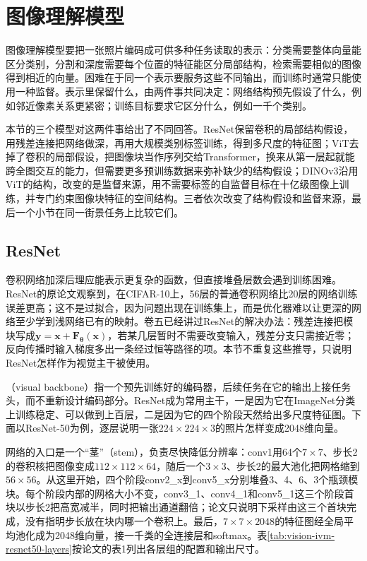 \section{图像理解模型}
\label{sec:vision-ivm-image-understanding}

图像理解模型要把一张照片编码成可供多种任务读取的表示：分类需要整体向量能区分类别，分割和深度需要每个位置的特征能区分局部结构，检索需要相似的图像得到相近的向量。困难在于同一个表示要服务这些不同输出，而训练时通常只能使用一种监督。表示里保留什么，由两件事共同决定：网络结构预先假设了什么，例如邻近像素关系更紧密；训练目标要求它区分什么，例如一千个类别。

本节的三个模型对这两件事给出了不同回答。ResNet保留卷积的局部结构假设，用残差连接把网络做深，再用大规模类别标签训练，得到多尺度的特征图；ViT去掉了卷积的局部假设，把图像块当作序列交给Transformer，换来从第一层起就能跨全图交互的能力，但需要更多预训练数据来弥补缺少的结构假设；DINOv3沿用ViT的结构，改变的是监督来源，用不需要标签的自监督目标在十亿级图像上训练，并专门约束图像块特征的空间结构。三者依次改变了结构假设和监督来源，最后一个小节在同一街景任务上比较它们。

\subsection{ResNet}
\label{sec:vision-ivm-resnet}

卷积网络加深后理应能表示更复杂的函数，但直接堆叠层数会遇到训练困难。ResNet的原论文观察到，在CIFAR-10上，56层的普通卷积网络比20层的网络训练误差更高；这不是过拟合，因为问题出现在训练集上，而是优化器难以让更深的网络至少学到浅网络已有的映射。卷五已经讲过ResNet的解决办法：残差连接把模块写成$\bm y=\bm x+\bm F_{\bm\theta}(\bm x)$，若某几层暂时不需要改变输入，残差分支只需接近零；反向传播时输入梯度多出一条经过恒等路径的项。本节不重复这些推导，只说明ResNet怎样作为视觉主干被使用。

（visual backbone）指一个预先训练好的编码器，后续任务在它的输出上接任务头，而不重新设计编码部分。ResNet成为常用主干，一是因为它在ImageNet分类上训练稳定、可以做到上百层，二是因为它的四个阶段天然给出多尺度特征图。下面以ResNet-50为例，逐层说明一张$224\times224\times3$的照片怎样变成2048维向量。

网络的入口是一个“茎”（stem），负责尽快降低分辨率：conv1用64个$7\times7$、步长2的卷积核把图像变成$112\times112\times64$，随后一个$3\times3$、步长2的最大池化把网格缩到$56\times56$。从这里开始，四个阶段conv2\_x到conv5\_x分别堆叠3、4、6、3个瓶颈模块。每个阶段内部的网格大小不变，conv3\_1、conv4\_1和conv5\_1这三个阶段首块以步长2把高宽减半，同时把输出通道翻倍；论文只说明下采样由这三个首块完成，没有指明步长放在块内哪一个卷积上。最后，$7\times7\times2048$的特征图经全局平均池化成为2048维向量，接一千类的全连接层和softmax。表\ref{tab:vision-ivm-resnet50-layers}按论文的表1列出各层组的配置和输出尺寸。

